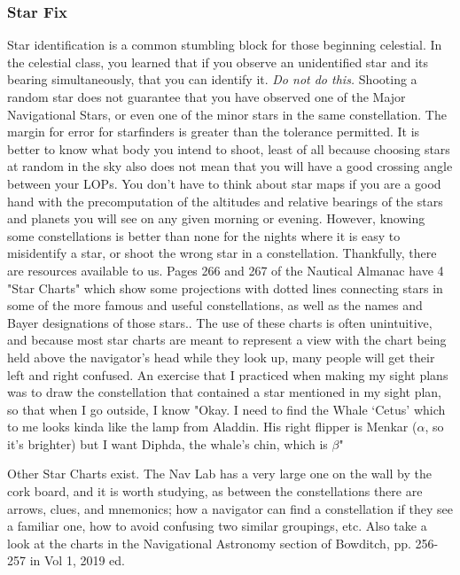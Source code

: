 \documentclass[letterpaper,12pt]{article}
\begin{document}
\subsubsection*{Star Fix}
Star identification is a common stumbling block for those beginning celestial.
In the celestial class, you learned that if you observe an unidentified star and its bearing simultaneously, that you can identify it.
\emph{Do not do this.}
Shooting a random star does not guarantee that you have observed one of the Major Navigational Stars, or even one of the minor stars in the same constellation.
The margin for error for starfinders is greater than the tolerance permitted.
It is better to know what body you intend to shoot, least of all because choosing stars at random in the sky also does not mean that you will have a good crossing angle between your LOPs.
You don't have to think about star maps if you are a good hand with the precomputation of the altitudes and relative bearings of the stars and planets you will see on any given morning or evening.
However, knowing some constellations is better than none for the nights where it is easy to misidentify a star, or shoot the wrong star in a constellation.
Thankfully, there are resources available to us.
Pages 266 and 267 of the Nautical Almanac have 4 "Star Charts" which show some projections with dotted lines connecting stars in some of the more famous and useful constellations, as well as the names and Bayer designations of those stars.\parencite{unitedkingdromhydrographicofficeNauticalAlmanac20242023}.
The use of these charts is often unintuitive, and because most star charts are meant to represent a view with the chart being held above the navigator's head while they look up, many people will get their left and right confused. 
An exercise that I practiced when making my sight plans was to draw the constellation that contained a star mentioned in my sight plan, so that when I go outside, I know
"Okay. I need to find the Whale `Cetus' which to me looks kinda like the lamp from Aladdin.
His right flipper is Menkar ($\alpha$, so it's brighter) but I want Diphda, the whale's chin, which is $\beta$"

Other Star Charts exist. The Nav Lab has a very large one on the wall by the cork board, and it is worth studying, as between the constellations there are arrows, clues, and mnemonics; how a navigator can find a constellation if they see a familiar one, how to avoid confusing two similar groupings, etc. 
Also take a look at the charts in the Navigational Astronomy section of Bowditch, pp. 256-257 in Vol 1, 2019 ed.
\end{document}
